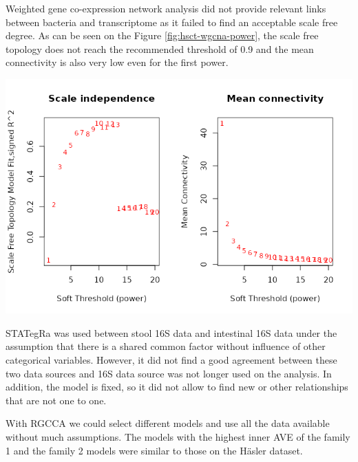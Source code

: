 \documentclass[
  12pt,
  a4paper,
  twoside,
  openright]{book}
\let\origfigure\figure
\let\endorigfigure\endfigure
\renewenvironment{figure}[1][2] {
    \expandafter\origfigure\expandafter[!ht]
} {
    \endorigfigure
}
\begin{document}
Weighted gene co-expression network analysis did not provide relevant links between bacteria and transcriptome as it failed to find an acceptable scale free degree.
As can be seen on the Figure \ref{fig:hsct-wgcna-power}, the scale free topology does not reach the recommended threshold of 0.9 and the mean connectivity is also very low even for the first power.

\begin{figure}
\includegraphics[width=1\linewidth]{images/hsct-wgcna-power} \caption[Power evaluation of WGCNA of the HSCT dataset.]{Power evaluation of WGCNA of the HSCT dataset. On the ordinate the power on the abscissa on the left the scale free topology model fit; on the right the mean connectivity. There is a low fit even on large power and the mean connectivity is below 100 from the very first value.}\label{fig:hsct-wgcna-power}
\end{figure}

STATegRa was used between stool 16S data and intestinal 16S data under the assumption that there is a shared common factor without influence of other categorical variables.
However, it did not find a good agreement between these two data sources and 16S data source was not longer used on the analysis.
In addition, the model is fixed, so it did not allow to find new or other relationships that are not one to one.

With RGCCA we could select different models and use all the data available without much assumptions.
The models with the highest inner AVE of the family 1 and the family 2 models were similar to those on the Häsler dataset.
\end{document}
